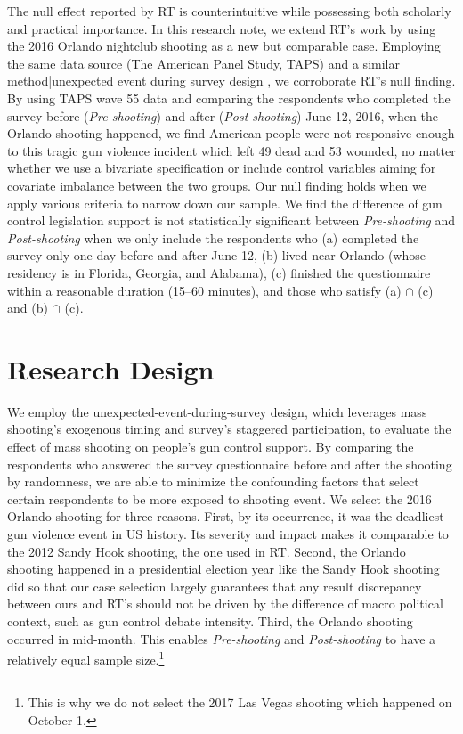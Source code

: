 \documentclass[11pt]{article}
\begin{document}
The null effect reported by RT is counterintuitive while possessing both scholarly and practical importance. In this research note, we extend RT's work by using the 2016 Orlando nightclub shooting as a new but comparable case. Employing the same data source (The American Panel Study, TAPS) and a similar method|unexpected event during survey design \autocite{munoz2020unexpected-even}, we corroborate RT's null finding. By using TAPS wave 55 data and comparing the respondents who completed the survey before (\emph{Pre-shooting}) and after (\emph{Post-shooting}) June 12, 2016, when the Orlando shooting happened, we find American people were not responsive enough to this tragic gun violence incident which left 49 dead and 53 wounded, no matter whether we use a bivariate specification or include control variables aiming for covariate imbalance between the two groups. Our null finding holds when we apply various criteria to narrow down our sample. We find the difference of gun control legislation support is not statistically significant between \emph{Pre-shooting} and \emph{Post-shooting} when we only include the respondents who (a) completed the survey only one day before and after June 12, (b) lived near Orlando (whose residency is in Florida, Georgia, and Alabama), (c) finished the questionnaire within a reasonable duration (15--60 minutes), and those who satisfy (a) \(\cap\) (c) and (b) \(\cap\) (c).

\section{Research Design}
We employ the unexpected-event-during-survey design, which leverages mass shooting's exogenous timing and survey's staggered participation, to evaluate the effect of mass shooting on people's gun control support. By comparing the respondents who answered the survey questionnaire before and after the shooting by randomness, we are able to minimize the confounding factors that select certain respondents to be more exposed to shooting event. We select the 2016 Orlando shooting for three reasons. First, by its occurrence, it was the deadliest gun violence event in US history. Its severity and impact makes it comparable to the 2012 Sandy Hook shooting, the one used in RT. Second, the Orlando shooting happened in a presidential election year like the Sandy Hook shooting did so that our case selection largely guarantees that any result discrepancy between ours and RT's should not be driven by the difference of macro political context, such as gun control debate intensity. Third, the Orlando shooting occurred in mid-month. This enables \emph{Pre-shooting} and \emph{Post-shooting} to have a relatively equal sample size.\footnote{This is why we do not select the 2017 Las Vegas shooting which happened on October 1.}
\end{document}
